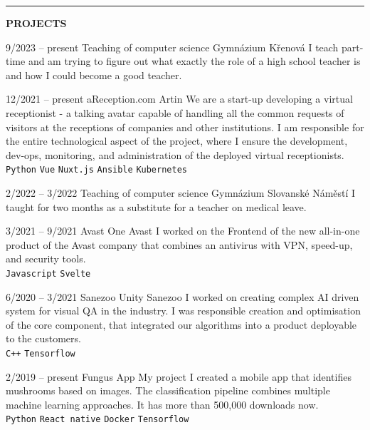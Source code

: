 \documentclass[10pt,A4]{article}
\newcommand{\cvsection}[2] {
\textcolor{sectcol}{\uppercase{\textbf{#1}}}
}
\newcommand{\cvsect}[4]{
	\textcolor{#3}{\hrule}
	\colorbox{#3}{ {\cvsection{#1}{#4}}}
}
\begin{document}
	\cvsect{Projects}{0.49}{thirdcol}{textcol}\\[20pt]
	\begin{entrylist}
		\entry
			{9/2023 -- present}
			{Teaching of computer science}
			{Gymnázium Křenová}
			{ 
				I teach part-time and am trying to figure out what exactly the role of a high school teacher is and how I could become a good teacher.
				\\ 
			}

		\entry
			{12/2021 -- present}
			{aReception.com}
			{Artin}
			{ 
				We are a start-up developing a virtual receptionist - a talking avatar capable of handling all the common requests of visitors at the receptions of companies and other institutions. I am responsible for the entire technological aspect of the project, where I ensure the development, dev-ops, monitoring, and administration of the deployed virtual receptionists.
				\\
				\texttt{Python}\slashsep
				\texttt{Vue}\slashsep
				\texttt{Nuxt.js}\slashsep
				\texttt{Ansible}\slashsep
				\texttt{Kubernetes}
			}

		\entry
			{2/2022 -- 3/2022}
			{Teaching of computer science}
			{Gymnázium Slovanské Náměstí}
			{ I taught for two months as a substitute for a teacher on medical leave. 
				\\ 
			}

		\entry
			{3/2021 -- 9/2021}
			{Avast One}
			{Avast}
			{ I worked on the Frontend of the new all-in-one product of the Avast company that combines an antivirus with VPN, speed-up, and security tools.
				\\ 
				\texttt{Javascript}\slashsep
				\texttt{Svelte}
			}

		\entry
				{6/2020 -- 3/2021}
				{Sanezoo Unity}
				{Sanezoo}
				{I worked on creating complex AI driven system for visual QA in the industry. 
					I was responsible creation and optimisation of the core component, that integrated our algorithms into a product deployable to the customers. 
					\\ 
					\texttt{C++}\slashsep
					\texttt{Tensorflow}
				}

		\entry
			{2/2019 -- present}
			{Fungus App}
			{My project}
			{I created a mobile app that identifies mushrooms based on
				images. The classification pipeline combines multiple machine learning approaches. 
				It has more than 500,000 downloads now.
				\\ 
				\texttt{Python}\slashsep
				\texttt{React native}\slashsep
				\texttt{Docker}\slashsep
				\texttt{Tensorflow}}
		


\end{entrylist}
\end{document}

